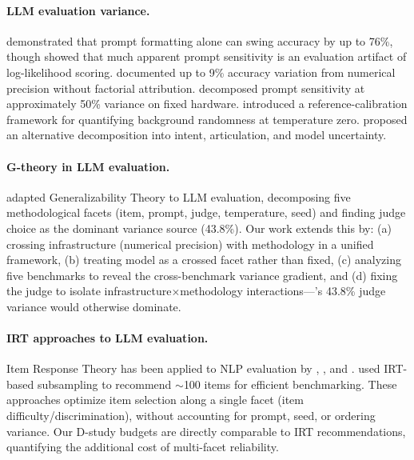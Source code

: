 \documentclass[letterpaper,11pt]{article}
\begin{document}
\paragraph{LLM evaluation variance.}
\citet{sclar2024quantifying} demonstrated that prompt formatting alone can swing accuracy by up to 76\%, though \citet{hua2025emnlp} showed that much apparent prompt sensitivity is an evaluation artifact of log-likelihood scoring.
\citet{yuan2025llminference} documented up to 9\% accuracy variation from numerical precision without factorial attribution.
\citet{brittlebench2026} decomposed prompt sensitivity at approximately 50\% variance on fixed hardware.
\citet{messina2026background} introduced a reference-calibration framework for quantifying background randomness at temperature zero.
\citet{kunievsky2025decomposition} proposed an alternative decomposition into intent, articulation, and model uncertainty.

\paragraph{G-theory in LLM evaluation.}
\citet{mesting2026reliability} adapted Generalizability Theory to LLM evaluation, decomposing five methodological facets (item, prompt, judge, temperature, seed) and finding judge choice as the dominant variance source (43.8\%).
Our work extends this by: (a) crossing infrastructure (numerical precision) with methodology in a unified framework, (b) treating model as a crossed facet rather than fixed, (c) analyzing five benchmarks to reveal the cross-benchmark variance gradient, and (d) fixing the judge to isolate infrastructure$\times$methodology interactions---\citeauthor{mesting2026reliability}'s 43.8\% judge variance would otherwise dominate.

\paragraph{IRT approaches to LLM evaluation.}
Item Response Theory has been applied to NLP evaluation by \citet{lalor2019learning}, \citet{rodriguez2021evaluation}, and \citet{vania2021comparing}.
\citet{polo2024tinybenchmarks} used IRT-based subsampling to recommend $\sim$100 items for efficient benchmarking.
These approaches optimize item selection along a single facet (item difficulty/discrimination), without accounting for prompt, seed, or ordering variance.
Our D-study budgets are directly comparable to IRT recommendations, quantifying the additional cost of multi-facet reliability.
\end{document}
